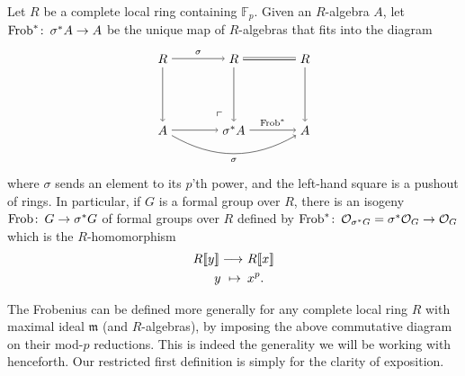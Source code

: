 \documentclass{gtpart}
\theoremstyle{definition}
\theoremstyle{remark}
\def\co{\colon\thinspace}
\newcommand{\mb}[1]{\mathbb{#1}}
\newcommand{\mf}[1]{\mathfrak{#1}}
\newcommand{\CO}{{\cal O}}
\newcommand{\Frob}{{\rm Frob}}
\newcommand{\BF}{{\mb F}}
\newcommand{\fm}{{\mf m}}
\numberwithin{equation}{section}
\numberwithin{thm}{section}
\begin{document}
Let $R$ be a complete local ring containing $\BF_p$.  Given an 
$R$-algebra $A$, let $\Frob^* \co \sigma^*A \to A$ be the unique map of 
$R$-algebras that fits into the diagram 
\begin{equation}
\label{relFrob2}
 \begin{tikzpicture}[baseline=(current bounding box.center)]
         \node (LT) at (0, 2) {$R$}; 
         \node (MT) at (2, 2) {$R$}; 
         \node (RT) at (4, 2) {$R$}; 
         \node (LB) at (0, 0) {$A$}; 
         \node (MB) at (2, 0) {$\sigma^*A$}; 
         \node (RB) at (4, 0) {$A$}; 
         \node at (1.6, 0.4) {$\ulcorner$}; 
         \draw [->] (LT) -- node [above] {$\scriptstyle \sigma$} (MT); 
         \draw [double distance=1.3pt] (MT) -- (RT); 
         \draw [->] (LT) -- (LB); 
         \draw [->] (MT) -- (MB); 
         \draw [->] (RT) -- (RB); 
         \draw [->] (LB) -- (MB); 
         \draw [->] (MB) -- node [above] {$\scriptstyle \Frob^*$} (RB); 
         \draw [->] (LB) to [out = -30, in = -150] node [below] {$\scriptstyle \sigma$} (RB); 
 \end{tikzpicture}
\end{equation}
where $\sigma$ sends an element to its $p$'th power, and the left-hand 
square is a pushout of rings.  In particular, if $G$ is a formal group 
over $R$, there is an isogeny $\Frob \co G \to \sigma^*G$ of formal 
groups over $R$ defined by 
$\Frob^* \co \CO_{\sigma^*G} = \sigma^*\CO_G \to \CO_G$ which is the 
$R$-homomorphism 
\begin{equation*}
\begin{split}
 R \llbracket y \rrbracket \longrightarrow & ~ R \llbracket x \rrbracket \\
                    y ~ \mapsto \thinspace & ~ x^p.  
\end{split}
\end{equation*}

The Frobenius can be defined more generally for any complete local ring 
$R$ with maximal ideal $\fm$ (and $R$-algebras), by imposing the above 
commutative diagram on their mod-$p$ reductions.  This is indeed the 
generality we will be working with henceforth.  Our restricted first 
definition is simply for the clarity of exposition.  
\end{document}
